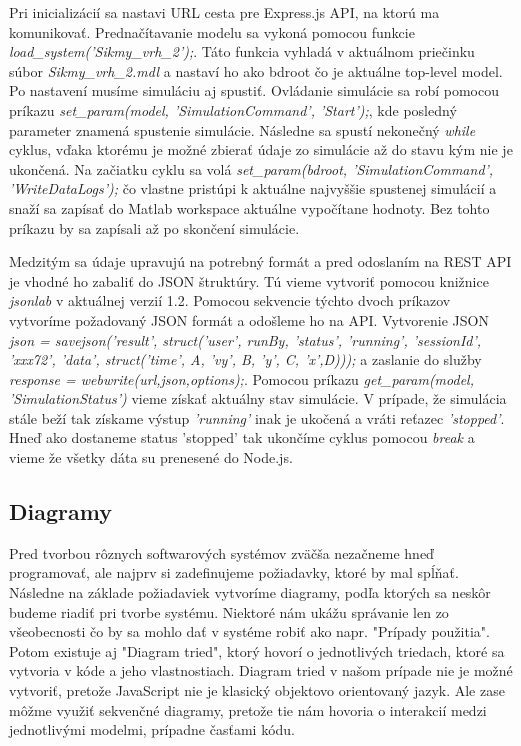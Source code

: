 Pri inicializácií sa nastavi URL cesta pre Express.js API, na ktorú ma komunikovať. Prednačítavanie modelu sa vykoná pomocou funkcie \textit{load\_system('Sikmy\_vrh\_2');}. Táto funkcia vyhladá v aktuálnom priečinku súbor \textit{Sikmy\_vrh\_2.mdl} a nastaví ho ako bdroot čo je aktuálne top-level model. Po nastavení musíme simuláciu aj spustiť. Ovládanie simulácie sa robí pomocou príkazu \textit{set\_param(model, 'SimulationCommand', 'Start');}, kde posledný parameter znamená spustenie simulácie.
Následne sa spustí nekonečný \textit{while} cyklus, vďaka ktorému je možné zbierať údaje zo simulácie až do stavu kým nie je ukončená. 
Na začiatku cyklu sa volá \textit{set\_param(bdroot, 'SimulationCommand', 'WriteDataLogs');} čo vlastne pristúpi k aktuálne najvyššie spustenej simulácií a snaží sa zapísať do Matlab workspace aktuálne vypočítane hodnoty. Bez tohto príkazu by sa zapísali až po skončení simulácie.

Medzitým sa údaje upravujú na potrebný formát a pred odoslaním na REST API je vhodné ho zabaliť do JSON štruktúry. Tú vieme vytvoriť pomocou knižnice \textit{jsonlab} v aktuálnej verzií 1.2.
Pomocou sekvencie týchto dvoch príkazov vytvoríme požadovaný JSON formát a odošleme ho na API. Vytvorenie JSON \textit{json = savejson('result', struct('user', runBy, 'status', 'running', 'sessionId', 'xxx72', 'data', struct('time', A, 'vy', B, 'y', C, 'x',D)));} a zaslanie do služby \textit{response = webwrite(url,json,options);}. Pomocou príkazu \textit{get\_param(model, 'SimulationStatus')} vieme získať aktuálny stav simulácie. V prípade, že simulácia stále beží tak získame výstup \textit{'running'} inak je ukočená a vráti reťazec \textit{'stopped'}. Hneď ako dostaneme status 'stopped' tak ukončíme cyklus pomocou \textit{break} a vieme že všetky dáta su prenesené do Node.js.

\subsection{Diagramy}
Pred tvorbou rôznych softwarových systémov zväčša nezačneme hneď programovať, ale najprv si zadefinujeme požiadavky, ktoré by mal spĺňať. Následne na základe požiadaviek vytvoríme diagramy, podľa ktorých sa neskôr budeme riadiť pri tvorbe systému. Niektoré nám ukážu správanie len zo všeobecnosti čo by sa mohlo dať v systéme robiť ako napr. "Prípady použitia". Potom existuje aj "Diagram tried", ktorý hovorí o jednotlivých triedach, ktoré sa vytvoria v kóde a jeho vlastnostiach. Diagram tried v našom prípade nie je možné vytvoriť, pretože JavaScript nie je klasický objektovo orientovaný jazyk. Ale zase môžme využiť sekvenčné diagramy, pretože tie nám hovoria o interakcií medzi jednotlivými modelmi, prípadne časťami kódu.

